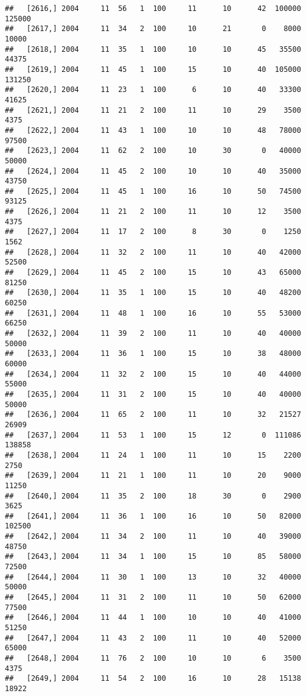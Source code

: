 \documentclass{article}\usepackage[]{graphicx}\usepackage[]{color}
\makeatletter
\newenvironment{kframe}{%
 \def\at@end@of@kframe{}%
 \ifinner\ifhmode%
  \def\at@end@of@kframe{\end{minipage}}%
  \begin{minipage}{\columnwidth}%
 \fi\fi%
 \def\FrameCommand##1{\hskip\@totalleftmargin \hskip-\fboxsep
 \colorbox{shadecolor}{##1}\hskip-\fboxsep
     \hskip-\linewidth \hskip-\@totalleftmargin \hskip\columnwidth}%
 \MakeFramed {\advance\hsize-\width
   \@totalleftmargin\z@ \linewidth\hsize
   \@setminipage}}%
 {\par\unskip\endMakeFramed%
 \at@end@of@kframe}
\newenvironment{knitrout}{}{} %
\makeatother
\begin{document}
\begin{knitrout}
\begin{kframe}
\begin{verbatim}
##   [2616,] 2004     11  56   1  100     11      10      42  100000  125000
##   [2617,] 2004     11  34   2  100     10      21       0    8000   10000
##   [2618,] 2004     11  35   1  100     10      10      45   35500   44375
##   [2619,] 2004     11  45   1  100     15      10      40  105000  131250
##   [2620,] 2004     11  23   1  100      6      10      40   33300   41625
##   [2621,] 2004     11  21   2  100     11      10      29    3500    4375
##   [2622,] 2004     11  43   1  100     10      10      48   78000   97500
##   [2623,] 2004     11  62   2  100     10      30       0   40000   50000
##   [2624,] 2004     11  45   2  100     10      10      40   35000   43750
##   [2625,] 2004     11  45   1  100     16      10      50   74500   93125
##   [2626,] 2004     11  21   2  100     11      10      12    3500    4375
##   [2627,] 2004     11  17   2  100      8      30       0    1250    1562
##   [2628,] 2004     11  32   2  100     11      10      40   42000   52500
##   [2629,] 2004     11  45   2  100     15      10      43   65000   81250
##   [2630,] 2004     11  35   1  100     15      10      40   48200   60250
##   [2631,] 2004     11  48   1  100     16      10      55   53000   66250
##   [2632,] 2004     11  39   2  100     11      10      40   40000   50000
##   [2633,] 2004     11  36   1  100     15      10      38   48000   60000
##   [2634,] 2004     11  32   2  100     15      10      40   44000   55000
##   [2635,] 2004     11  31   2  100     15      10      40   40000   50000
##   [2636,] 2004     11  65   2  100     11      10      32   21527   26909
##   [2637,] 2004     11  53   1  100     15      12       0  111086  138858
##   [2638,] 2004     11  24   1  100     11      10      15    2200    2750
##   [2639,] 2004     11  21   1  100     11      10      20    9000   11250
##   [2640,] 2004     11  35   2  100     18      30       0    2900    3625
##   [2641,] 2004     11  36   1  100     16      10      50   82000  102500
##   [2642,] 2004     11  34   2  100     11      10      40   39000   48750
##   [2643,] 2004     11  34   1  100     15      10      85   58000   72500
##   [2644,] 2004     11  30   1  100     13      10      32   40000   50000
##   [2645,] 2004     11  31   2  100     11      10      50   62000   77500
##   [2646,] 2004     11  44   1  100     10      10      40   41000   51250
##   [2647,] 2004     11  43   2  100     11      10      40   52000   65000
##   [2648,] 2004     11  76   2  100     10      10       6    3500    4375
##   [2649,] 2004     11  54   2  100     16      10      28   15138   18922

\end{verbatim}
\end{kframe}
\end{knitrout}
\end{document}
